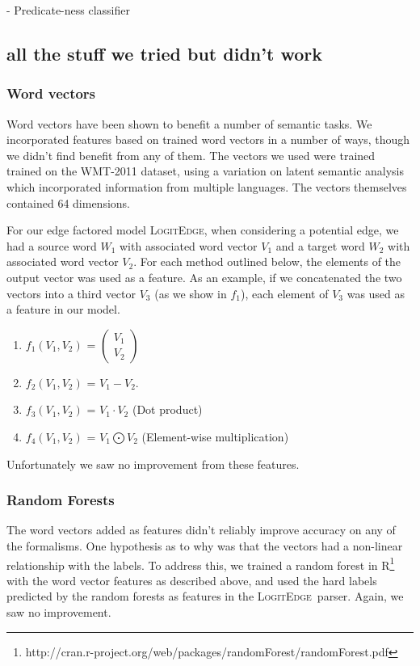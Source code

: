 \documentclass[11pt]{article}
\newcommand{\logitedge}{\textsc{LogitEdge}}
\begin{document}
 - Predicate-ness classifier


\subsection{all the stuff we tried but didn't work}
\subsubsection{Word vectors}
Word vectors have been shown to benefit a number of semantic tasks. We incorporated features based on trained word vectors in a number of ways, though we didn't find benefit from any of them. The vectors we used \cite{wordVectors} were trained trained on the WMT-2011 dataset, using a variation on latent semantic analysis which incorporated information from multiple languages. The vectors themselves contained 64 dimensions. 

 For our edge factored model \logitedge, when considering a potential edge, we had a source word $W_1$ with associated word vector $V_1$ and a target word $W_2$ with associated word vector $V_2$. For each method outlined below, the elements of the output vector was used as a feature. As an example, if we concatenated the two vectors into a third vector $V_3$ (as we show in $f_1$), each element of $V_3$ was used as a feature in our model. 
\begin{enumerate}
\item $f_1(V_1,V_2)$ = $ \left( \begin{smallmatrix} V_1\\ V_2 \end{smallmatrix} \right)$
\item $f_2(V_1,V_2)$ = $V_1 - V_2$.
\item $f_3(V_1,V_2)$ = $V_1 \cdot V_2$ (Dot product)
\item $f_4(V_1,V_2)$ = $V_1 \bigodot V_2$ (Element-wise multiplication)
\end{enumerate}
Unfortunately we saw no improvement from these features.

\subsubsection{Random Forests}
The word vectors added as features didn't reliably improve accuracy on any of the formalisms. One hypothesis as to why was that the vectors had a non-linear relationship with the labels. To address this, we trained a random forest in R\footnote{http://cran.r-project.org/web/packages/randomForest/randomForest.pdf} with the word vector features as described above, and used the hard labels predicted by the random forests as features in the \logitedge\ parser. Again, we saw no improvement.
\end{document}
